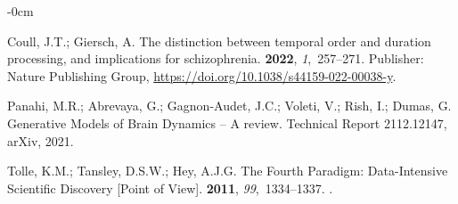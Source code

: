 \documentclass[brainsci, %
               review,submit,pdftex,moreauthors
               ]{Definitions/mdpi}
\begin{document}
\begin{adjustwidth}{-\extralength}{0cm}
\begin{thebibliography}{999}
  Coull, J.T.; Giersch, A.
  \newblock The distinction between temporal order and duration processing, and
    implications for schizophrenia.
   {\bf 2022}, {\em 1},~257--271.
  \newblock Publisher: Nature Publishing Group,
    {\url{https://doi.org/10.1038/s44159-022-00038-y}}.
  
  Panahi, M.R.; Abrevaya, G.; Gagnon-Audet, J.C.; Voleti, V.; Rish, I.; Dumas, G.
  \newblock Generative {Models} of {Brain} {Dynamics} -- {A} review.
  \newblock Technical Report 2112.12147, arXiv,  2021.
  
  Tolle, K.M.; Tansley, D.S.W.; Hey, A.J.G.
  \newblock The {Fourth} {Paradigm}: {Data}-{Intensive} {Scientific} {Discovery}
    [{Point} of {View}].
   {\bf 2011}, {\em 99},~1334--1337.
  .
  
  \end{thebibliography}
  


\end{adjustwidth}
\end{document}
